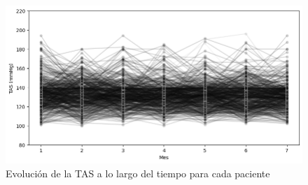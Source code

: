 \documentclass[spanish]{article}
\numberwithin{figure}{subsection}
\numberwithin{equation}{subsection}
\numberwithin{table}{subsection}
\begin{document}
\begin{figure}[H]
	\centering
	\includegraphics[scale=0.5]{img/TAS_vs_tpo_perfiles_individuales.png}
	\caption{Evolución de la TAS a lo largo del tiempo para cada paciente}
	\label{perfiles_individuales}
\end{figure}


\newpage
\nocite{*}
\renewcommand{\refname}{Bibliografía}

\end{document}
